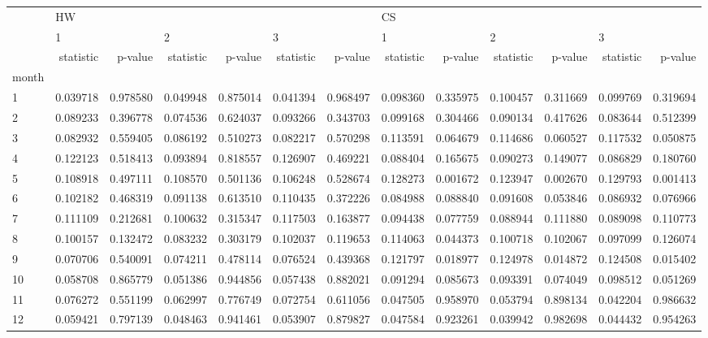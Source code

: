 \begin{tabular}{lrrrrrrrrrrrr}
\toprule
{} & \multicolumn{6}{l}{HW} & \multicolumn{6}{l}{CS} \\
{} & \multicolumn{2}{l}{1} & \multicolumn{2}{l}{2} & \multicolumn{2}{l}{3} & \multicolumn{2}{l}{1} & \multicolumn{2}{l}{2} & \multicolumn{2}{l}{3} \\
{} & statistic &   p-value & statistic &   p-value & statistic &   p-value & statistic &   p-value & statistic &   p-value & statistic &   p-value \\
month &           &           &           &           &           &           &           &           &           &           &           &           \\
\midrule
1     &  0.039718 &  0.978580 &  0.049948 &  0.875014 &  0.041394 &  0.968497 &  0.098360 &  0.335975 &  0.100457 &  0.311669 &  0.099769 &  0.319694 \\
2     &  0.089233 &  0.396778 &  0.074536 &  0.624037 &  0.093266 &  0.343703 &  0.099168 &  0.304466 &  0.090134 &  0.417626 &  0.083644 &  0.512399 \\
3     &  0.082932 &  0.559405 &  0.086192 &  0.510273 &  0.082217 &  0.570298 &  0.113591 &  0.064679 &  0.114686 &  0.060527 &  0.117532 &  0.050875 \\
4     &  0.122123 &  0.518413 &  0.093894 &  0.818557 &  0.126907 &  0.469221 &  0.088404 &  0.165675 &  0.090273 &  0.149077 &  0.086829 &  0.180760 \\
5     &  0.108918 &  0.497111 &  0.108570 &  0.501136 &  0.106248 &  0.528674 &  0.128273 &  0.001672 &  0.123947 &  0.002670 &  0.129793 &  0.001413 \\
6     &  0.102182 &  0.468319 &  0.091138 &  0.613510 &  0.110435 &  0.372226 &  0.084988 &  0.088840 &  0.091608 &  0.053846 &  0.086932 &  0.076966 \\
7     &  0.111109 &  0.212681 &  0.100632 &  0.315347 &  0.117503 &  0.163877 &  0.094438 &  0.077759 &  0.088944 &  0.111880 &  0.089098 &  0.110773 \\
8     &  0.100157 &  0.132472 &  0.083232 &  0.303179 &  0.102037 &  0.119653 &  0.114063 &  0.044373 &  0.100718 &  0.102067 &  0.097099 &  0.126074 \\
9     &  0.070706 &  0.540091 &  0.074211 &  0.478114 &  0.076524 &  0.439368 &  0.121797 &  0.018977 &  0.124978 &  0.014872 &  0.124508 &  0.015402 \\
10    &  0.058708 &  0.865779 &  0.051386 &  0.944856 &  0.057438 &  0.882021 &  0.091294 &  0.085673 &  0.093391 &  0.074049 &  0.098512 &  0.051269 \\
11    &  0.076272 &  0.551199 &  0.062997 &  0.776749 &  0.072754 &  0.611056 &  0.047505 &  0.958970 &  0.053794 &  0.898134 &  0.042204 &  0.986632 \\
12    &  0.059421 &  0.797139 &  0.048463 &  0.941461 &  0.053907 &  0.879827 &  0.047584 &  0.923261 &  0.039942 &  0.982698 &  0.044432 &  0.954263 \\
\bottomrule
\end{tabular}
